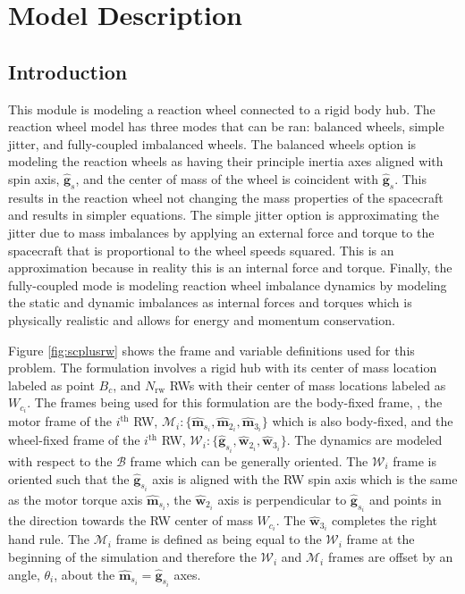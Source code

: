 \section{Model Description}

\subsection{Introduction}

This module is modeling a reaction wheel connected to a rigid body hub. The reaction wheel model has three modes that can be ran: balanced wheels, simple jitter, and fully-coupled imbalanced wheels. The balanced wheels option is modeling the reaction wheels as having their principle inertia axes aligned with spin axis, $\hat{\bm g}_s$, and the center of mass of the wheel is coincident with $\hat{\bm g}_s$. This results in the reaction wheel not changing the mass properties of the spacecraft and results in simpler equations. The simple jitter option is approximating the jitter due to mass imbalances by applying an external force and torque to the spacecraft that is proportional to the wheel speeds squared. This is an approximation because in reality this is an internal force and torque. Finally, the fully-coupled mode is modeling reaction wheel imbalance dynamics by modeling the static and dynamic imbalances as internal forces and torques which is physically realistic and allows for energy and momentum conservation. 

Figure \ref{fig:scplusrw} shows the frame and variable definitions used for this problem. The formulation involves a rigid hub with its center of mass location labeled as point $B_c$, and $N_\text{rw}$ RWs with their center of mass locations labeled as $W_{c_i}$. The frames being used for this formulation are the body-fixed frame, , the motor frame of the $i^\text{th}$ RW, $\mathcal{M}_i:\{\hat{\bm m}_{s_i},\hat{\bm m}_{2_i},\hat{\bm m}_{3_i}\}$ which is also body-fixed, and the wheel-fixed frame of the $i^\text{th}$ RW, $\mathcal{W}_i:\{\hat{\bm g}_{s_i},\hat{\bm w}_{2_i},\hat{\bm w}_{3_i}\}$. The dynamics are modeled with respect to the $\mathcal{B}$ frame which can be generally oriented. The $\mathcal{W}_i$ frame is oriented such that the $\hat{\bm g}_{s_i}$ axis is aligned with the RW spin axis  which is the same as the motor torque axis $\hat{\bm m}_{s_{i}}$, the $\hat{\bm w}_{2_i}$ axis is perpendicular to $\hat{\bm g}_{s_i}$ and points in the direction towards the RW center of mass $W_{c_i}$. The $\hat{\bm w}_{3_i}$ completes the right hand rule. The $\mathcal{M}_i$ frame is defined as being equal to the $\mathcal{W}_i$ frame at the beginning of the simulation and therefore the $\mathcal{W}_i$ and $\mathcal{M}_i$ frames are offset by an angle, $\theta_i$, about the $\hat{\bm m}_{s_i} = \hat{\bm g}_{s_i}$ axes. 
	
